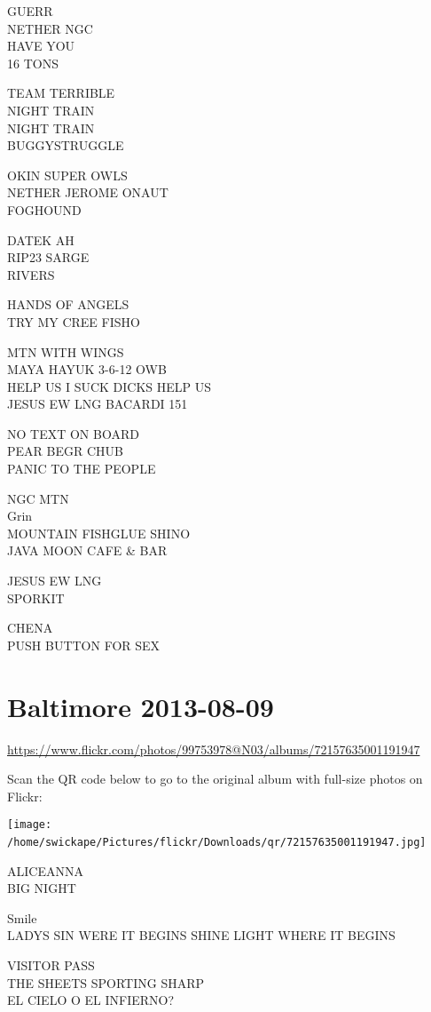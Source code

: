 \documentclass[10pt,letterpaper]{article}
\begin{document}
GUERR\\
NETHER NGC\\
HAVE YOU\\
16 TONS

TEAM TERRIBLE\\
NIGHT TRAIN\\
NIGHT TRAIN\\
BUGGYSTRUGGLE

OKIN SUPER OWLS\\
NETHER JEROME ONAUT\\
FOGHOUND

DATEK AH\\
RIP23 SARGE\\
RIVERS

HANDS OF ANGELS\\
TRY MY CREE FISHO

MTN WITH WINGS\\
MAYA HAYUK 3{-}6{-}12 OWB\\
HELP US I SUCK DICKS HELP US\\
JESUS EW LNG BACARDI 151

NO TEXT ON BOARD\\
PEAR BEGR CHUB\\
PANIC TO THE PEOPLE

NGC MTN\\
Grin\\
MOUNTAIN FISHGLUE SHINO\\
JAVA MOON CAFE \& BAR

JESUS EW LNG\\
SPORKIT

CHENA\\
PUSH BUTTON FOR SEX
\

\section*{Baltimore 2013-08-09}

\url{https://www.flickr.com/photos/99753978@N03/albums/72157635001191947}

Scan the QR code below to go to the original album with full-size photos on Flickr:

\texttt{[image: /home/swickape/Pictures/flickr/Downloads/qr/72157635001191947.jpg]}
\

ALICEANNA\\
BIG NIGHT

Smile\\
LADYS SIN WERE IT BEGINS SHINE LIGHT WHERE IT BEGINS

VISITOR PASS\\
THE SHEETS SPORTING SHARP\\
EL CIELO O EL INFIERNO?
\end{document}
